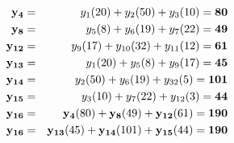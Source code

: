 \begin{frame}
\begin{columns}
\begin{column}{5cm}
		\begin{scriptsize}
		\begin{eqnarray*}		
			\mathbf{y_4} 	&=& y_1 (20) + y_2 (50) + y_3 (10) = \textbf{80} \\
			\mathbf{y_8} 	&=& y_5 (8)  + y_6 (19) + y_7 (22) = \textbf{49} \\
			\mathbf{y_{12}} &=& y_9 (17) + y_{10} (32) + y_{11} (12) = \textbf{61} \\			
			\mathbf{y_{13}} &=& y_1 (20) + y_5 (8) + y_9 (17) = \textbf{45} \\
			\mathbf{y_{14}} &=& y_2 (50) + y_6 (19) + y_{32} (5) = \textbf{101} \\
			\mathbf{y_{15}} &=& y_3 (10) + y_7 (22) + y_{12} (3) = \textbf{44} \\				
			\mathbf{y_{16}} &=& \mathbf{y_4} (80) + \mathbf{y_8} (49) + \mathbf{y_{12}} (61) =
			\textbf{190} \\ 
			\mathbf{y_{16}} &=& \mathbf{y_{13}} (45) + \mathbf{y_{14}} (101) +
			\mathbf{y_{15}} (44) = \textbf{190}
		\end{eqnarray*}					
		\end{scriptsize}
		\end{column}
	\end{columns}	
\end{frame}


